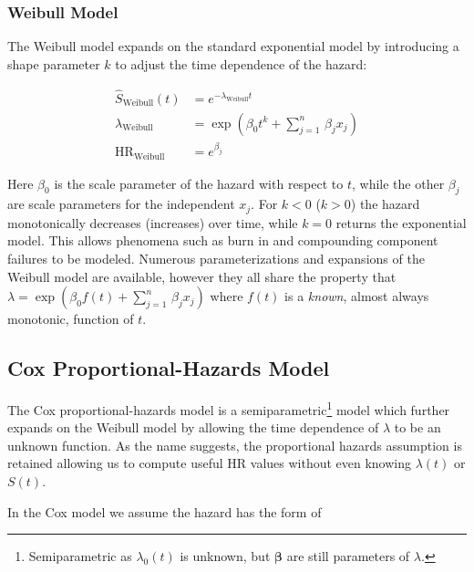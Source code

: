 \subsubsection{Weibull Model}
\label{additional:Survival:weibull}
The Weibull model expands on the standard exponential model
by introducing a shape parameter $k$ to adjust the time dependence of the hazard:

\begin{equation}\label{eq:Survival:weibull}
\begin{aligned}
\hat{S}_{\text{Weibull}}\left(t\right) &= e^{-\lambda_{\text{Weibull}} t} \\
\lambda_{\text{Weibull}} &= \exp\left(\beta_{0} t^{k} + \sum_{j=1}^{n}\, \beta_{j} x_{j}\right) \\
\text{HR}_{\text{Weibull}} &= e^{\beta_{j}}
\end{aligned}
\end{equation}

\noindent Here $\beta_{0}$ is the scale parameter of the hazard with respect to $t$,
while the other $\beta_{j}$ are scale parameters for the independent $x_{j}$.
For $k<0$ ($k>0$) the hazard monotonically decreases (increases) over time,
while $k=0$ returns the exponential model.
This allows phenomena such as burn in and compounding component failures to be modeled.
Numerous parameterizations and expansions of the Weibull model are available,
however they all share the property that
$\lambda = \exp\left(\beta_{0} f\left(t\right) + \sum_{j=1}^{n}\, \beta_{j} x_{j}\right)$
where $f\left(t\right)$ is a {\em known}, almost always monotonic, function of $t$.

\subsection{Cox Proportional-Hazards Model}
\label{additional:Survival:cox}
The Cox proportional-hazards model is a
semiparametric\footnote{Semiparametric as $\lambda_{0}\left(t\right)$ is unknown, but $\bm{\beta}$ are still parameters of $\lambda$.} model
which further expands on the Weibull model by allowing
the time dependence of $\lambda$ to be an unknown function.
As the name suggests, the proportional hazards assumption is retained
allowing us to compute useful HR values
without even knowing $\lambda\left(t\right)$ or $S\left(t\right)$.

In the Cox model we assume the hazard has the form of

